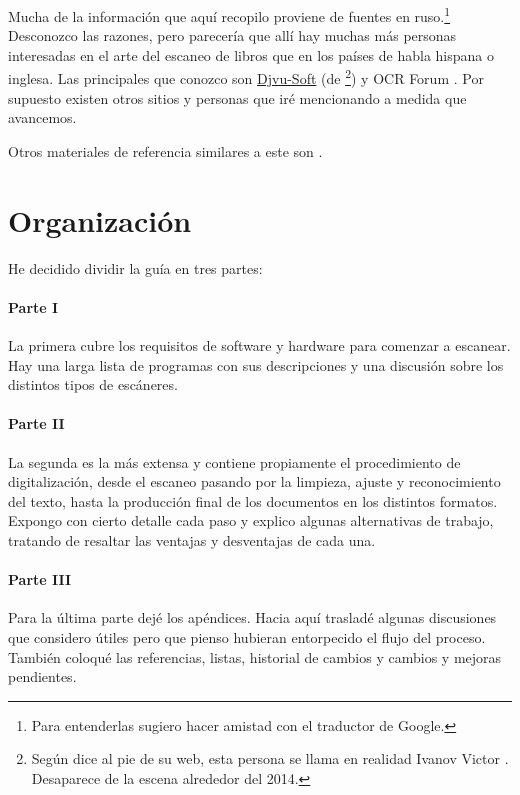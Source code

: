 \documentclass[%
	a5paper,
	10pt,
	twoside,
	openright,
	final,
]{memoir}
\begin{document}
	Mucha de la información que aquí recopilo proviene de fuentes en ruso.\footnote{Para entenderlas sugiero hacer amistad con el traductor de Google.} Desconozco las razones, pero parecería que allí hay muchas más personas interesadas en el arte del escaneo de libros que en los países de habla hispana o inglesa. Las principales que conozco son \href{http://djvu-soft.narod.ru/}{Djvu-Soft} \cite{DjvuSoft} (de \mondaytwothousand\footnote{Según dice al pie de su web, esta persona se llama en realidad Ivanov Victor%
	. Desaparece de la escena alrededor del 2014.}) y OCR Forum \cite{OCRForum}. Por supuesto existen otros sitios y personas que iré mencionando a medida que avancemos.

	Otros materiales de referencia similares a este son \cite{WikimediaCreatingDjVu, ScanAndShare2008, HowToMakeDjVu, rutrackertwdragon, ALinuxGuideToBookScanning, LIBRITOS}.

	\section{Organización} He decidido dividir la guía en tres partes:

	\paragraph*{Parte I} La primera cubre los requisitos de software y hardware para comenzar a escanear. Hay una larga lista de programas con sus descripciones y una discusión sobre los distintos tipos de escáneres.

	\paragraph*{Parte II} La segunda es la más extensa y contiene propiamente el procedimiento de digitalización, desde el escaneo pasando por la limpieza, ajuste y reconocimiento del texto, hasta la producción final de los documentos en los distintos formatos. Expongo con cierto detalle cada paso y explico algunas alternativas de trabajo, tratando de resaltar las ventajas y desventajas de cada una.

	\paragraph*{Parte III} Para la última parte dejé los apéndices. Hacia aquí trasladé algunas discusiones que considero útiles pero que pienso hubieran entorpecido el flujo del proceso. También coloqué las referencias, listas, historial de cambios y cambios y mejoras pendientes.
\end{document}
